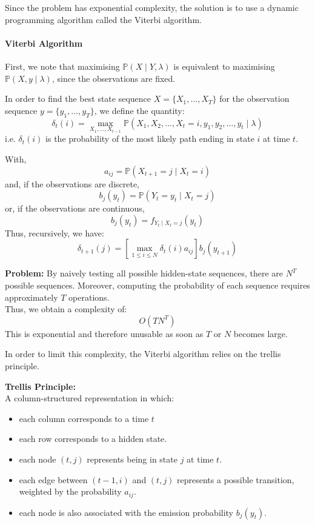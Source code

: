 \documentclass[11pt]{article}
\begin{document}
Since the problem has exponential complexity, the solution is to use a dynamic programming algorithm called the Viterbi algorithm.

\paragraph{Viterbi Algorithm} 



First, we note that maximising $\mathbb{P}(X \mid Y,\lambda)$ is equivalent to maximising $\mathbb{P}(X,y \mid \lambda)$, since the observations are fixed.

In order to find the best state sequence $X=\{X_1,\dots,X_T\}$ for the observation sequence $y=\{y_1,\dots,y_T\}$, we define the quantity:
\[
\delta_t(i)= \max_{X_1,\dots,X_{t-1}} \mathbb{P}(X_1,X_2,\dots,X_t=i,y_1,y_2,\dots,y_t \mid \lambda)
\]
i.e. $\delta_t(i)$ is the probability of the most likely path ending in state $i$ at time $t$.

\vspace{0.3cm}

With,
\[
a_{ij}=\mathbb{P}(X_{t+1}=j \mid X_t=i)
\]
and, if the observations are discrete,
\[
b_j(y_t)=\mathbb{P}(Y_t=y_t \mid X_t=j)
\] 
or, if the observations are continuous, 
\[
b_j(y_t)=f_{Y_t \mid X_t=j}(y_t)
\]
Thus, recursively, we have:
\[
\delta_{t+1}(j)=\left[\max_{1\leq i\leq N}\delta_t(i)a_{ij}\right]b_j(y_{t+1})
\]

\textbf{Problem:}
By naively testing all possible hidden-state sequences, there are $N^T$ possible sequences.
Moreover, computing the probability of each sequence requires approximately $T$ operations.\\
Thus, we obtain a complexity of:
\[
O(TN^T)
\]
This is exponential and therefore unusable as soon as $T$ or $N$ becomes large.

In order to limit this complexity, the Viterbi algorithm relies on the trellis principle.

\textbf{Trellis Principle:}\\
A column-structured representation in which:
\begin{itemize}
    \item each column corresponds to a time $t$
    \item each row corresponds to a hidden state.
    \item each node $(t,j)$ represents being in state $j$ at time $t$.
    \item each edge between $(t-1,i)$ and $(t,j)$ represents a possible transition, weighted by the probability $a_{ij}$.
    \item each node is also associated with the emission probability $b_j(y_t)$.
\end{itemize}
\end{document}
